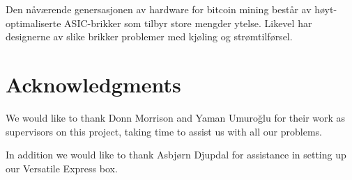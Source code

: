 Den nåværende genersasjonen av hardware for bitcoin mining består av høyt-optimaliserte
ASIC-brikker som tilbyr store mengder ytelse. Likevel har designerne av slike brikker
problemer med kjøling og strømtilførsel.

\chapter*{Acknowledgments}


We would like to thank Donn Morrison and Yaman Umuroğlu for their work as
supervisors on this project, taking time to assist us with all our problems.

In addition we would like to thank Asbjørn Djupdal for assistance in setting
up our Versatile Express box.

